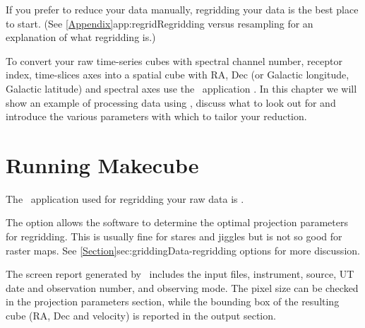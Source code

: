 \documentclass[11pt,oneside,chapters]{starlink}
\begin{document}
If you prefer to reduce your data manually, regridding your data
is the best place to start. (See
\cref{Appendix}{app:regrid}{Regridding versus resampling} for an
explanation of what regridding is.)

To convert your raw time-series cubes with spectral channel number,
receptor index, time-slices axes into a spatial cube with RA, Dec (or
Galactic longitude, Galactic latitude) and spectral axes use the
\smurf\ application \makecube. In this chapter we will show an example
of processing data using \makecube, discuss what to look out for and
introduce the various parameters with which to tailor your reduction.


\section{Running Makecube}
The \smurf\ application used for regridding your raw data is \makecube.

The  option allows the software to determine the
optimal projection parameters for regridding.  This is usually fine
for stares and jiggles but is not so good for raster maps.  See
\cref{Section}{sec:gridding}{Data-regridding options} for more
discussion.

The screen report generated by \makecube\ includes the input files,
instrument, source, UT date and observation number, and observing
mode. The pixel size can be checked in the projection parameters
section, while the bounding box of the resulting cube (RA, Dec and
velocity) is reported in the output section.
\end{document}
